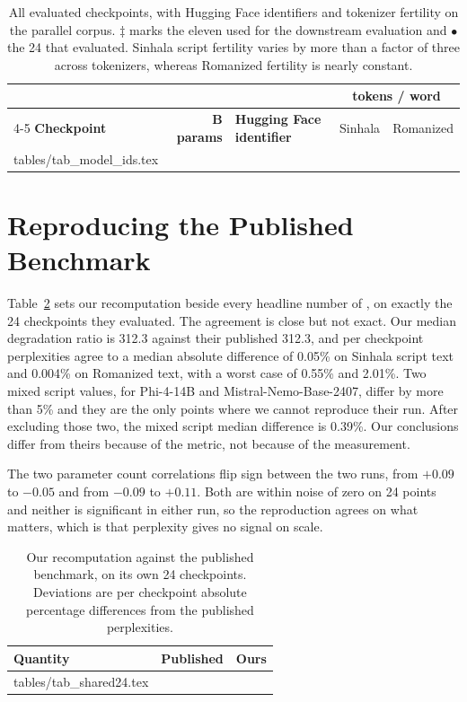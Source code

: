 \documentclass[11pt]{article}
\makeatletter
\newcommand{\rows}[1]{\@@input #1 }
\makeatother
\begin{document}
\begin{table}[t]
\centering\small
\setlength{\tabcolsep}{5pt}
\begin{tabular}{@{}lrlrr@{}}
\toprule
& & & \multicolumn{2}{c}{\textbf{tokens / word}} \\
\cmidrule(lr){4-5}
\textbf{Checkpoint} & \textbf{B params} & \textbf{Hugging Face identifier}
& Sinhala & Romanized \\
\midrule
\rows{tables/tab_model_ids.tex}
\bottomrule
\end{tabular}
\caption{All evaluated checkpoints, with Hugging Face identifiers and tokenizer
fertility on the parallel corpus. $\ddagger$ marks the eleven used for the
downstream evaluation and $\bullet$ the 24 that
\citet{rajapakse-weerasinghe-2026-script} evaluated. Sinhala script fertility
varies by more than a factor of three across tokenizers, whereas Romanized
fertility is nearly constant.}
\label{tab:modelids}
\end{table}

\section{Reproducing the Published Benchmark}
\label{sec:repro24}

Table~\ref{tab:shared24} sets our recomputation beside every headline number of
\citet{rajapakse-weerasinghe-2026-script}, on exactly the 24 checkpoints they
evaluated. The agreement is close but not exact. Our median degradation ratio is 312.3
against their published 312.3, and per checkpoint perplexities agree to a median
absolute difference of 0.05\% on Sinhala script text and 0.004\% on Romanized text, with
a worst case of 0.55\% and 2.01\%. Two mixed script
values, for Phi-4-14B and Mistral-Nemo-Base-2407, differ by more than 5\% and they are
the only points where we cannot reproduce their run. After excluding those two, the
mixed script median difference is 0.39\%. Our conclusions differ from
theirs because of the metric, not because of the measurement.

The two parameter count correlations flip sign between the two runs, from $+0.09$
to $-0.05$ and from $-0.09$ to $+0.11$. Both are within noise of zero on 24
points and neither is significant in either run, so the reproduction agrees on
what matters, which is that perplexity gives no signal on scale.

\begin{table}[t]
\centering\scriptsize
\setlength{\tabcolsep}{2.4pt}
\begin{tabular}{@{}lrr@{}}
\toprule
\textbf{Quantity} & \textbf{Published} & \textbf{Ours} \\
\midrule
\rows{tables/tab_shared24.tex}
\bottomrule
\end{tabular}
\caption{Our recomputation against the published benchmark, on its own 24
checkpoints. Deviations are per checkpoint absolute percentage differences from
the published perplexities.}
\label{tab:shared24}
\end{table}
\end{document}
